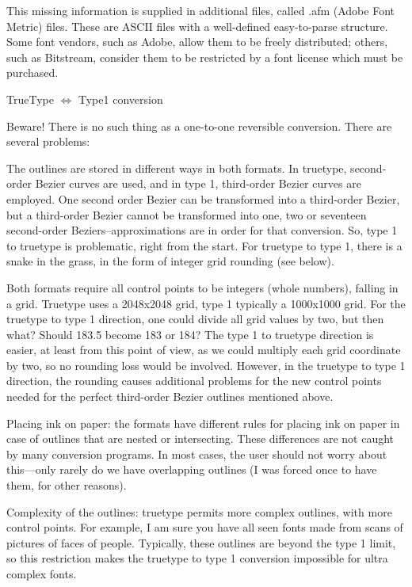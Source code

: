 This missing information is supplied in additional files, called .afm
(Adobe Font Metric) files. These are ASCII files with a well-defined
easy-to-parse structure.  Some font vendors, such as Adobe, allow them
to be freely distributed; others, such as Bitstream, consider them to
be restricted by a font license which must be purchased.

 {TrueType $\Leftrightarrow$ Type1 conversion}

Beware! There is no such thing as a one-to-one reversible
conversion. There are several problems:

The outlines are stored in different ways in both formats. In
truetype, second-order Bezier curves are used, and in type 1,
third-order Bezier curves are employed. One second order Bezier can be
transformed into a third-order Bezier, but a third-order Bezier cannot
be transformed into one, two or seventeen second-order
Beziers--approximations are in order for that conversion. So, type 1
to truetype is problematic, right from the start. For truetype to type
1, there is a snake in the grass, in the form of integer grid rounding
(see below).


Both formats require all control points to be integers (whole
numbers), falling in a grid. Truetype uses a 2048x2048 grid, type 1
typically a 1000x1000 grid. For the truetype to type 1 direction, one
could divide all grid values by two, but then what? Should 183.5
become 183 or 184? The type 1 to truetype direction is easier, at
least from this point of view, as we could multiply each grid
coordinate by two, so no rounding loss would be involved. However, in
the truetype to type 1 direction, the rounding causes additional
problems for the new control points needed for the perfect third-order
Bezier outlines mentioned above.


Placing ink on paper: the formats have different rules for placing ink
on paper in case of outlines that are nested or intersecting. These
differences are not caught by many conversion programs. In most cases,
the user should not worry about this---only rarely do we have
overlapping outlines (I was forced once to have them, for other
reasons).


Complexity of the outlines: truetype permits more complex outlines,
with more control points. For example, I am sure you have all seen
fonts made from scans of pictures of faces of people. Typically, these
outlines are beyond the type 1 limit, so this restriction makes the
truetype to type 1 conversion impossible for ultra complex fonts.

